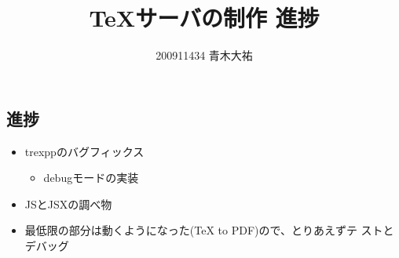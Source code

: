 \documentclass[a4paper,8pt,min]{jsarticle}
\title{TeXサーバの制作 進捗}
\author{200911434 青木大祐}
\begin{document}
\maketitle

\subsection*{進捗}
\begin{itemize}
 \item trexppのバグフィックス
       \begin{itemize}
        \item debugモードの実装
       \end{itemize}
\vspace{1zh}
 \item JSとJSXの調べ物
 \item 最低限の部分は動くようになった(TeX to PDF)ので、とりあえずテ
       ストとデバッグ
\end{itemize}
\end{document}
